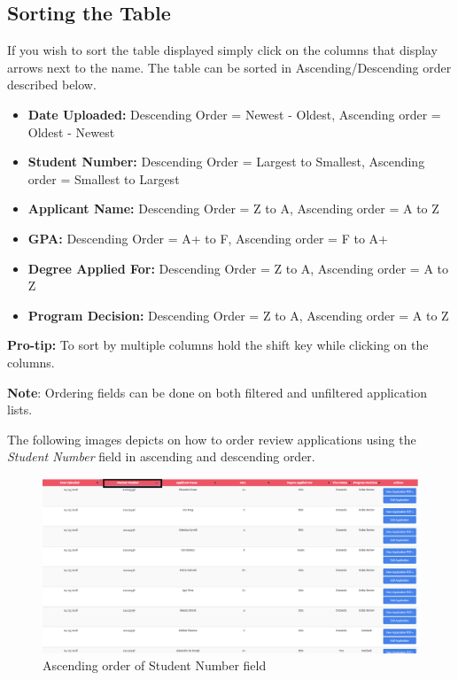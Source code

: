 \documentclass[fontsize=12pt,paper=letter,twoside]{scrartcl}
\begin{document}
\subsection{Sorting the Table}
If you wish to sort the table displayed simply click on the columns that display arrows next to the name. The table can be sorted in Ascending/Descending order described below.
\begin{itemize}
\item \textbf{Date Uploaded:} Descending Order = Newest - Oldest, Ascending order = Oldest - Newest
\item \textbf{Student Number:} Descending Order = Largest to Smallest, Ascending order = Smallest to Largest
\item \textbf{Applicant Name:} Descending Order = Z to A, Ascending order = A to Z
\item \textbf{GPA:} Descending Order = A+ to F, Ascending order = F to A+
\item \textbf{Degree Applied For:} Descending Order = Z to A, Ascending order = A to Z
\item \textbf{Program Decision:} Descending Order = Z to A, Ascending order = A to Z
\end{itemize}
\textbf{Pro-tip:} To sort by multiple columns hold the shift key while clicking on the columns.

\bigskip
\noindent \textbf{Note}: Ordering fields can be done on both filtered and unfiltered application lists.

\bigskip
\noindent The following images depicts on how to order review applications using the \emph{Student Number} field in ascending and descending order.

\begin{figure}[!htb]
\begin{center}
\includegraphics[width=.99\textwidth]{images/ma/order_ascending.png}
\end{center}
\caption{Ascending order of Student Number field}
\label{fig:order_ascending}
\end{figure}
\end{document}
